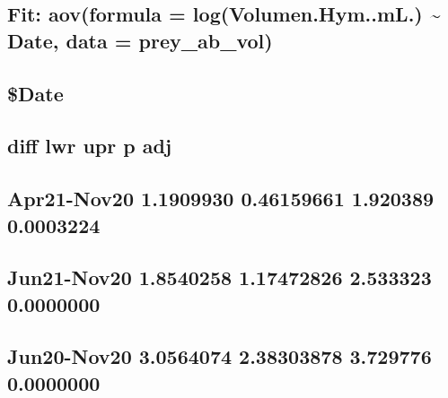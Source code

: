 \documentclass[
]{article}
\begin{document}
\hypertarget{section-19}{%
\subsection{}\label{section-19}}

\hypertarget{fit-aovformula-logvolumen.hym..ml.-date-data-prey_ab_vol}{%
\subsection{Fit: aov(formula = log(Volumen.Hym..mL.) \textasciitilde{}
Date, data =
prey\_ab\_vol)}\label{fit-aovformula-logvolumen.hym..ml.-date-data-prey_ab_vol}}

\hypertarget{section-20}{%
\subsection{}\label{section-20}}

\hypertarget{date}{%
\subsection{\$Date}\label{date}}

\hypertarget{diff-lwr-upr-p-adj}{%
\subsection{diff lwr upr p adj}\label{diff-lwr-upr-p-adj}}

\hypertarget{apr21-nov20-1.1909930-0.46159661-1.920389-0.0003224}{%
\subsection{Apr21-Nov20 1.1909930 0.46159661 1.920389
0.0003224}\label{apr21-nov20-1.1909930-0.46159661-1.920389-0.0003224}}

\hypertarget{jun21-nov20-1.8540258-1.17472826-2.533323-0.0000000}{%
\subsection{Jun21-Nov20 1.8540258 1.17472826 2.533323
0.0000000}\label{jun21-nov20-1.8540258-1.17472826-2.533323-0.0000000}}

\hypertarget{jun20-nov20-3.0564074-2.38303878-3.729776-0.0000000}{%
\subsection{Jun20-Nov20 3.0564074 2.38303878 3.729776
0.0000000}\label{jun20-nov20-3.0564074-2.38303878-3.729776-0.0000000}}
\end{document}
